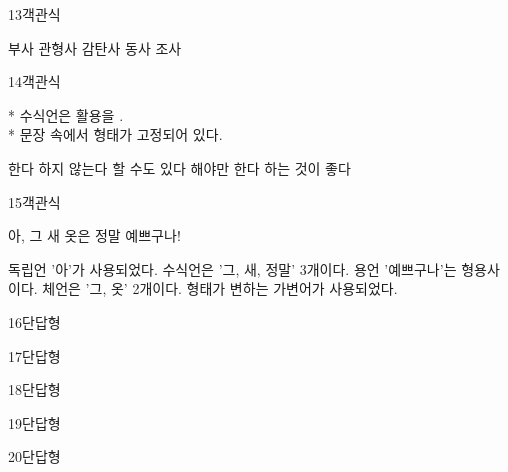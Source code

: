 \documentclass[fs9,seriesRus]{korfarm-base}
\begin{document}
\begin{kfQBlock}{13}{객관식}
\begin{kfChoices}
\kfChoice 부사
\kfChoice 관형사
\kfChoice 감탄사
\kfChoice 동사
\kfChoice 조사
\end{kfChoices}
\end{kfQBlock}
\begin{kfQBlock}{14}{객관식}
\begin{kfEvidence}* 수식언은 활용을 \kfFillBlank[20mm]{}. \\\relax
* 문장 속에서 형태가 고정되어 있다.\end{kfEvidence}
\begin{kfChoices}
\kfChoice 한다
\kfChoice 하지 않는다
\kfChoice 할 수도 있다
\kfChoice 해야만 한다
\kfChoice 하는 것이 좋다
\end{kfChoices}
\end{kfQBlock}
\begin{kfQBlock}{15}{객관식}
\begin{kfEvidence}아, 그 새 옷은 정말 예쁘구나!\end{kfEvidence}
\begin{kfChoices}
\kfChoice 독립언 '아'가 사용되었다.
\kfChoice 수식언은 '그, 새, 정말' 3개이다.
\kfChoice 용언 '예쁘구나'는 형용사이다.
\kfChoice 체언은 '그, 옷' 2개이다.
\kfChoice 형태가 변하는 가변어가 사용되었다.
\end{kfChoices}
\end{kfQBlock}
\begin{kfQBlock}{16}{단답형}
\end{kfQBlock}
\begin{kfQBlock}{17}{단답형}
\end{kfQBlock}
\begin{kfQBlock}{18}{단답형}
\end{kfQBlock}
\begin{kfQBlock}{19}{단답형}
\end{kfQBlock}
\begin{kfQBlock}{20}{단답형}
\end{kfQBlock}
\end{document}
